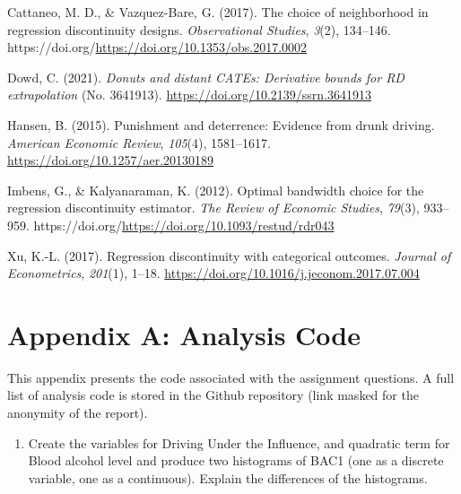 \documentclass[
  11pt,
]{article}
\providecommand{\tightlist}{%
  \setlength{\itemsep}{0pt}\setlength{\parskip}{0pt}}
\newlength{\cslhangindent}
\newlength{\cslentryspacingunit} %
\newenvironment{CSLReferences}[2] %
 {%
  \setlength{\parindent}{0pt}
  \ifodd #1
  \let\oldpar\par
  \def\par{\hangindent=\cslhangindent\oldpar}
  \fi
  \setlength{\parskip}{#2\cslentryspacingunit}
 }%
 {}
\begin{document}
\begin{CSLReferences}{1}{0}
\leavevmode{}%
Cattaneo, M. D., \& Vazquez-Bare, G. (2017). The choice of neighborhood
in regression discontinuity designs. \emph{Observational Studies},
\emph{3}(2), 134--146.
https://doi.org/\url{https://doi.org/10.1353/obs.2017.0002}

\leavevmode{}%
Dowd, C. (2021). \emph{Donuts and distant {CATEs}: Derivative bounds for
{RD} extrapolation} (No. 3641913).
\url{https://doi.org/10.2139/ssrn.3641913}

\leavevmode{}%
Hansen, B. (2015). Punishment and deterrence: Evidence from drunk
driving. \emph{American Economic Review}, \emph{105}(4), 1581--1617.
\url{https://doi.org/10.1257/aer.20130189}

\leavevmode{}%
Imbens, G., \& Kalyanaraman, K. (2012). Optimal bandwidth choice for the
regression discontinuity estimator. \emph{The Review of Economic
Studies}, \emph{79}(3), 933--959.
https://doi.org/\url{https://doi.org/10.1093/restud/rdr043}

\leavevmode{}%
Xu, K.-L. (2017). Regression discontinuity with categorical outcomes.
\emph{Journal of Econometrics}, \emph{201}(1), 1--18.
\url{https://doi.org/10.1016/j.jeconom.2017.07.004}

\end{CSLReferences}

\newpage

\hypertarget{appendix-a-analysis-code}{%
\section*{Appendix A: Analysis Code}\label{appendix-a-analysis-code}}

This appendix presents the code associated with the assignment
questions. A full list of analysis code is stored in the Github
repository (link masked for the anonymity of the report).

\begin{enumerate}
\def\labelenumi{\arabic{enumi}.}
\tightlist
\item
  Create the variables for Driving Under the Influence, and quadratic
  term for Blood alcohol level and produce two histograms of BAC1 (one
  as a discrete variable, one as a continuous). Explain the differences
  of the histograms.
\end{enumerate}
\end{document}
